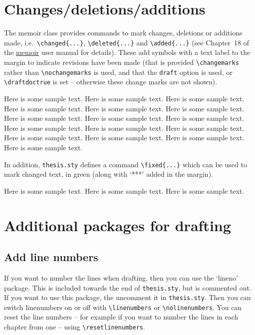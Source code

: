 \section{Changes/deletions/additions}\label{s:changes}

The memoir class provides commands to mark changes, deletions or
additions made, i.e.\ \verb|\changed{...}|, \verb|\deleted{...}| and
\verb|\added{...}| (see Chapter~18 of the 
\href{http://www.ctan.org/pkg/memoir}{memoir} user manual for
details). These add symbols with a text label to the margin to indicate
revisions have been made (that is provided \verb|\changemarks| rather
than \verb|\nochangemarks| is used, and that the \verb|draft| option is
used, or \verb|\draftdoctrue| is set -- otherwise these change marks are
not shown).

Here is some sample text. Here is some sample text. Here
is some sample text. Here is some sample text. Here is some sample text.
Here is some sample text. Here is some sample text.
Here is some sample text. Here is some sample text.
Here is some sample text. Here is some sample
text. Here is some sample text. Here is some sample text. Here is some
sample text. Here is some sample text. Here is some
sample text.

In addition, \verb|thesis.sty| defines a command \verb|\fixed{...}|
which can be used to mark changed text, in green (along with `***' 
added in the
margin).

Here is some sample text. Here is some sample
text.  Here is some sample text.

\section{Additional packages for drafting}

\subsection{Add line numbers}\label{s:lineno}

If you want to number the lines when drafting, then you can use the
`lineno' package. This is included towards the end of \verb|thesis.sty|,
but is commented out. If you want to use this package, the uncomment it
in \verb|thesis.sty|. Then you can switch linenumbers on or off with
\verb|\linenumbers| or \verb|\nolinenumbers|. You can reset the line
numbers -- for example if you want to number the lines in each chapter
from one -- using \verb|\resetlinenumbers|.

